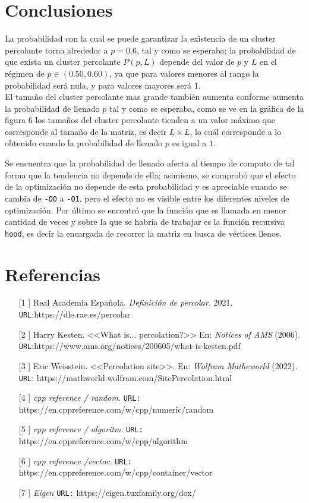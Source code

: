 \documentclass[11pt,twocolumn]{article}
\begin{document}
\section{\textbf{Conclusiones}}
La probabilidad con la cual se puede garantizar la existencia de un cluster percolante torna alrededor a $p=0.6$, tal y como se esperaba; la probabilidad de que exista un cluster percolante $P(p,L)$ depende del valor de $p$ y $L$ en el régimen de $p\in (0.50,0.60)$, ya que para valores menores al rango la probabilidad será nula, y para valores mayores será $1$. \\
El tamaño del cluster percolante mas grande también aumenta conforme aumenta la probabilidad de llenado $p$ tal y como se esperaba, como se ve en la gráfica de la figura 6 los tamaños del cluster percolante tienden a un valor máximo que corresponde al tamaño de la matriz, es decir $L\times L$, lo cuál corresponde a lo obtenido cuando la probabilidad de llenado $p$ es igual a $1$.

Se encuentra que la probabilidad de llenado afecta al tiempo de computo de tal forma que la tendencia no depende de ella; asimismo, se comprobó que el efecto de la optimización no depende de esta probabilidad y es apreciable cuando se cambia de \texttt{-O0} a \texttt{-O1}, pero el efecto no es visible entre los diferentes niveles de optimización. Por último se encontró que la función que es llamada en menor cantidad de veces y sobre la que se habría de trabajar es la función recursiva \texttt{hood}, es decir la  encargada de recorrer la matriz en busca de vértices llenos.

\printbibliography

\section{Referencias}
\begin{itemize}
    \item[[1]] Real Academia Española. \textit{Definición de percolar.} 2021. \texttt{URL}:https://dle.rae.es/percolar
    \item[[2]] Harry Kesten. <<What is... percolation?>> En: \textit{Notices of AMS} (2006). \texttt{URL}:https://www.ams.org/notices/200605/what-is-kesten.pdf
    \item[[3]] Eric Weisstein. <<Percolation site>>. En: \textit{Wolfram Matheworld} (2022). \texttt{URL}: https://mathworld.wolfram.com/SitePercolation.html
    \item[[4]] \textit{cpp reference / random.} \texttt{URL:}  https://en.cppreference.com/w/cpp/numeric/random
    \item[[5]] \textit{cpp reference / algoritm}. \texttt{URL:} https://en.cppreference.com/w/cpp/algorithm
    \item[[6]] \textit{cpp reference /vector.} \texttt{URL:}  https://en.cppreference.com/w/cpp/container/vector
    \item[[7]] \textit{Eigen} \texttt{URL:} https://eigen.tuxfamily.org/dox/
\end{itemize}
\end{document}
